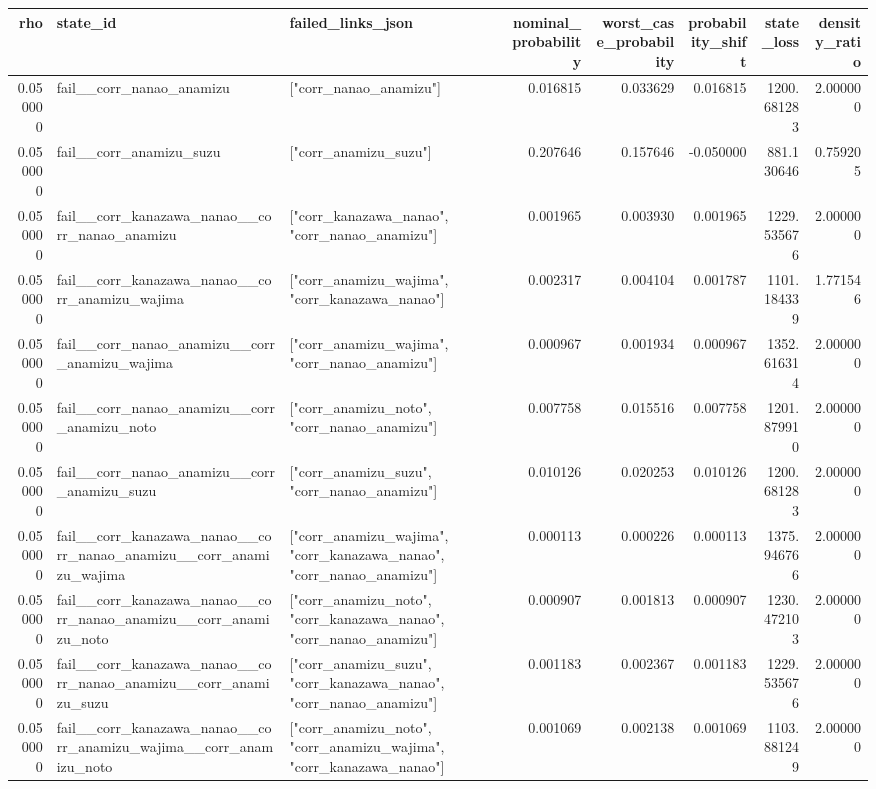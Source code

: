 \begin{tabular}{rllrrrrr}
\toprule
rho & state\_id & failed\_links\_json & nominal\_probability & worst\_case\_probability & probability\_shift & state\_loss & density\_ratio \\
\midrule
0.050000 & fail\_\_corr\_nanao\_anamizu & ["corr\_nanao\_anamizu"] & 0.016815 & 0.033629 & 0.016815 & 1200.681283 & 2.000000 \\
0.050000 & fail\_\_corr\_anamizu\_suzu & ["corr\_anamizu\_suzu"] & 0.207646 & 0.157646 & -0.050000 & 881.130646 & 0.759205 \\
0.050000 & fail\_\_corr\_kanazawa\_nanao\_\_corr\_nanao\_anamizu & ["corr\_kanazawa\_nanao", "corr\_nanao\_anamizu"] & 0.001965 & 0.003930 & 0.001965 & 1229.535676 & 2.000000 \\
0.050000 & fail\_\_corr\_kanazawa\_nanao\_\_corr\_anamizu\_wajima & ["corr\_anamizu\_wajima", "corr\_kanazawa\_nanao"] & 0.002317 & 0.004104 & 0.001787 & 1101.184339 & 1.771546 \\
0.050000 & fail\_\_corr\_nanao\_anamizu\_\_corr\_anamizu\_wajima & ["corr\_anamizu\_wajima", "corr\_nanao\_anamizu"] & 0.000967 & 0.001934 & 0.000967 & 1352.616314 & 2.000000 \\
0.050000 & fail\_\_corr\_nanao\_anamizu\_\_corr\_anamizu\_noto & ["corr\_anamizu\_noto", "corr\_nanao\_anamizu"] & 0.007758 & 0.015516 & 0.007758 & 1201.879910 & 2.000000 \\
0.050000 & fail\_\_corr\_nanao\_anamizu\_\_corr\_anamizu\_suzu & ["corr\_anamizu\_suzu", "corr\_nanao\_anamizu"] & 0.010126 & 0.020253 & 0.010126 & 1200.681283 & 2.000000 \\
0.050000 & fail\_\_corr\_kanazawa\_nanao\_\_corr\_nanao\_anamizu\_\_corr\_anamizu\_wajima & ["corr\_anamizu\_wajima", "corr\_kanazawa\_nanao", "corr\_nanao\_anamizu"] & 0.000113 & 0.000226 & 0.000113 & 1375.946766 & 2.000000 \\
0.050000 & fail\_\_corr\_kanazawa\_nanao\_\_corr\_nanao\_anamizu\_\_corr\_anamizu\_noto & ["corr\_anamizu\_noto", "corr\_kanazawa\_nanao", "corr\_nanao\_anamizu"] & 0.000907 & 0.001813 & 0.000907 & 1230.472103 & 2.000000 \\
0.050000 & fail\_\_corr\_kanazawa\_nanao\_\_corr\_nanao\_anamizu\_\_corr\_anamizu\_suzu & ["corr\_anamizu\_suzu", "corr\_kanazawa\_nanao", "corr\_nanao\_anamizu"] & 0.001183 & 0.002367 & 0.001183 & 1229.535676 & 2.000000 \\
0.050000 & fail\_\_corr\_kanazawa\_nanao\_\_corr\_anamizu\_wajima\_\_corr\_anamizu\_noto & ["corr\_anamizu\_noto", "corr\_anamizu\_wajima", "corr\_kanazawa\_nanao"] & 0.001069 & 0.002138 & 0.001069 & 1103.881249 & 2.000000 \\

\end{tabular}

